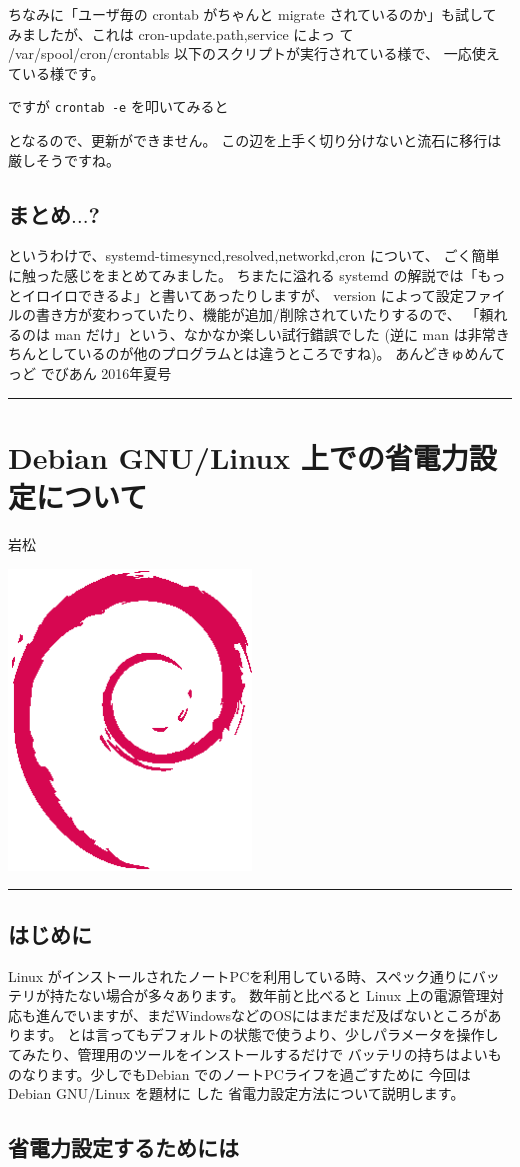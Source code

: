 \documentclass[mingoth,a4paper]{jsarticle}
\renewcommand{\dancersection}[2]{%
\newpage
あんどきゅめんてっど でびあん 2016年夏号
%
\vspace{0.1mm}\\
{\color{dancerdarkblue}\rule{\hsize}{2mm}}

%
%
\begin{minipage}[t]{0.6\hsize}
\color{dancerdarkblue}
\vspace{1cm}
\section{#1}
\hfill{}#2\\
\end{minipage}
\begin{minipage}[t]{0.4\hsize}
\vspace{-2cm}
\hfill{}\includegraphics[height=8cm]{image200502/openlogo-nd.eps}\\
\vspace{-5cm}
\end{minipage}
%
{\color{dancerlightblue}\rule{0.66\hsize}{2mm}}
%
\vspace{2cm}
}
\begin{document}
ちなみに「ユーザ毎の crontab がちゃんと migrate されているのか」も試して
みましたが、これは cron-update.{path,service} によっ
て /var/spool/cron/crontabls 以下のスクリプトが実行されている様で、
一応使えている様です。

ですが \verb|crontab -e| を叩いてみると
となるので、更新ができません。
この辺を上手く切り分けないと流石に移行は厳しそうですね。

\subsection{まとめ$\dots$?}

というわけで、systemd-{timesyncd,resolved,networkd,cron} について、
ごく簡単に触った感じをまとめてみました。
%
ちまたに溢れる systemd の解説では「もっとイロイロできるよ」と書いてあったりしますが、
version によって設定ファイルの書き方が変わっていたり、機能が追加/削除されていたりするので、
「頼れるのは man だけ」という、なかなか楽しい試行錯誤でした%
(逆に man は非常きちんとしているのが他のプログラムとは違うところですね)。
\dancersection{Debian GNU/Linux 上での省電力設定について}{岩松}

\subsection{はじめに}

Linux がインストールされたノートPCを利用している時、スペック通りにバッテリが持たない場合が多々あります。
数年前と比べると Linux 上の電源管理対応も進んでいますが、まだWindowsなどのOSにはまだまだ及ばないところがあります。
とは言ってもデフォルトの状態で使うより、少しパラメータを操作してみたり、管理用のツールをインストールするだけで
バッテリの持ちはよいものなります。少しでもDebian でのノートPCライフを過ごすために 今回は Debian GNU/Linux を題材に
した 省電力設定方法について説明します。


\subsection{省電力設定するためには}
\end{document}
